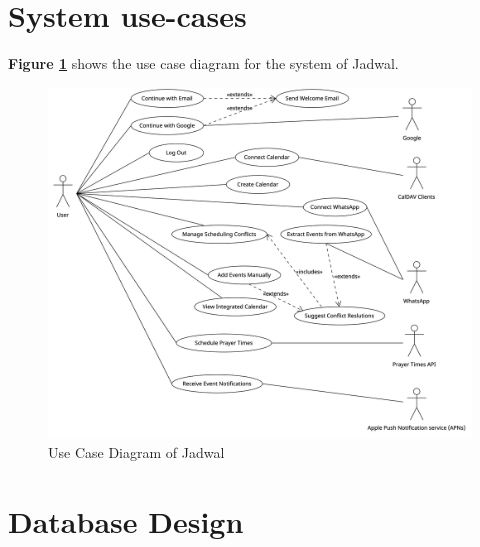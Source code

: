 \documentclass[12pt,a4paper]{report}
\begin{document}
\section{System use-cases}
   
\textbf{Figure \ref{fig:use-case-diagram}} shows the use case diagram for the system of Jadwal.

\begin{figure}[!h]
    \centering
    \includegraphics[width=\textwidth]{images/use-case-diagram.png}
    \caption{Use Case Diagram of Jadwal}
    \label{fig:use-case-diagram}
\end{figure}






















\section{Database Design}
\end{document}
